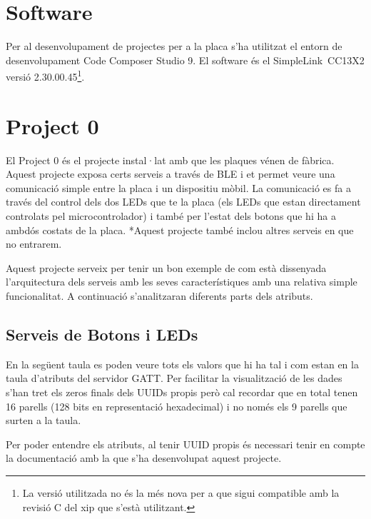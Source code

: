 \section{Software}
Per al desenvolupament de projectes per a la placa s'ha utilitzat el entorn de desenvolupament Code Composer Studio 9. El software és el SimpleLink\texttrademark\ CC13X2 versió 2.30.00.45\footnote{La versió utilitzada no és la més nova per a que sigui compatible amb la revisió C del xip que s'està utilitzant.}.

\section{Project 0}
El Project 0 és el projecte instal·lat amb que les plaques vénen de fàbrica. Aquest projecte exposa certs serveis a través de BLE i et permet veure una comunicació simple entre la placa i un dispositiu mòbil.
La comunicació es fa a través del control dels dos LEDs que te la placa (els LEDs que estan directament controlats pel microcontrolador) i també per l'estat dels botons que hi ha a ambdós costats de la placa.
*Aquest projecte també inclou altres serveis en que no entrarem.

Aquest projecte serveix per tenir un bon exemple de com està dissenyada l'arquitectura dels serveis amb les seves característiques amb una relativa simple funcionalitat. A continuació s'analitzaran diferents parts dels atributs.

\subsection{Serveis de Botons i LEDs}

En la següent taula es poden veure tots els valors que hi ha tal i com estan en la taula d'atributs del servidor GATT.
Per facilitar la visualització de les dades s'han tret els zeros finals dels UUIDs propis però cal recordar que en total tenen 16 parells (128 bits en representació hexadecimal) i no només els 9 parells que surten a la taula.

\begin{center}
	\begin{table}[h!]
	\end{table}
\end{center}

Per poder entendre els atributs, al tenir UUID propis és necessari tenir en compte la documentació amb la que s'ha desenvolupat aquest projecte.

